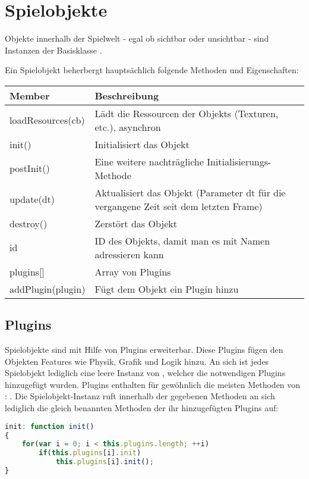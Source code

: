 \chapter{Spielobjekte}

Objekte innerhalb der Spielwelt - egal ob sichtbar oder unsichtbar - sind Instanzen der Basisklasse . 

Ein Spielobjekt beherbergt hauptsächlich folgende Methoden und Eigenschaften:

\begin{tabular}{|l|p{}|}
\hline 
\textbf{Member} & \textbf{Beschreibung} \\ 
\hline 
loadResources(cb) & Lädt die Ressourcen der Objekts (Texturen, etc.), asynchron \\ 
\hline 
init() & Initialisiert das Objekt \\ 
\hline 
postInit() & Eine weitere nachträgliche Initialisierungs-Methode \\ 
\hline 
update(dt) & Aktualisiert das Objekt (Parameter dt für die vergangene Zeit seit dem letzten Frame) \\ 
\hline 
destroy() & Zerstört das Objekt \\ 
\hline
id & ID des Objekts, damit man es mit Namen adressieren kann \\
\hline
plugins[] & Array von Plugins \\
\hline
addPlugin(plugin) & Fügt dem Objekt ein Plugin hinzu \\
\hline 
\end{tabular} 

\newpage
\section{Plugins}

Spielobjekte sind mit Hilfe von Plugins erweiterbar. Diese Plugins fügen den Objekten Features wie Physik, Grafik und Logik hinzu. An sich ist jedes Spielobjekt lediglich eine leere Instanz von , welcher die notwendigen Plugins hinzugefügt wurden. Plugins enthalten für gewöhnlich die meisten Methoden von : . Die Spielobjekt-Instanz ruft innerhalb der gegebenen Methoden an sich lediglich die gleich benannten Methoden der ihr hinzugefügten Plugins auf:

\begin{lstlisting}[language=JavaScript, caption=\textprog{init}-Methode von \textprog{BaseGameObject}]
init: function init()
{
	for(var i = 0; i < this.plugins.length; ++i)
		if(this.plugins[i].init)
			this.plugins[i].init();
}
\end{lstlisting}

